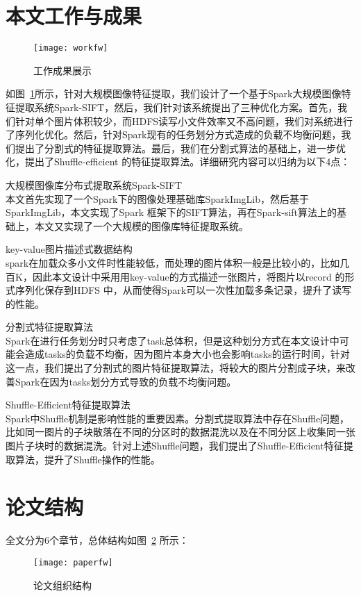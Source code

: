 \section{本文工作与成果}
\begin{figure}[htp]
\centering
\texttt{[image: workfw]}
\caption{工作成果展示}
\label{fig:workfw}
\end{figure}
如图~\ref{fig:workfw}所示，针对大规模图像特征提取，我们设计了一个基于Spark大规模图像特征提取系统Spark-SIFT，然后，我们针对该系统提出了三种优化方案。首先，我们针对单个图片体积较少，而HDFS读写小文件效率又不高问题，我们对系统进行了序列化优化。然后，针对Spark现有的任务划分方式造成的负载不均衡问题，我们提出了分割式的特征提取算法。最后，我们在分割式算法的基础上，进一步优化，提出了Shuffle-efficient 的特征提取算法。详细研究内容可以归纳为以下4点：
\begin{compactenum}
\item 大规模图像库分布式提取系统Spark-SIFT\\本文首先实现了一个Spark下的图像处理基础库SparkImgLib，然后基于SparkImgLib，本文实现了Spark 框架下的SIFT算法，再在Spark-sift算法上的基础上，本文又实现了一个大规模的图像库特征提取系统。
\item key-value图片描述式数据结构\\spark在加载众多小文件时性能较低，而处理的图片体积一般是比较小的，比如几百K，因此本文设计中采用用key-value的方式描述一张图片，将图片以record 的形式序列化保存到HDFS 中，从而使得Spark可以一次性加载多条记录，提升了读写的性能。
\item 分割式特征提取算法\\Spark在进行任务划分时只考虑了task总体积，但是这种划分方式在本文设计中可能会造成tasks的负载不均衡，因为图片本身大小也会影响tasks的运行时间，针对这一点，我们提出了分割式的图片特征提取算法，将较大的图片分割成子块，来改善Spark在因为tasks划分方式导致的负载不均衡问题。
\item Shuffle-Efficient特征提取算法\\Spark中Shuffle机制是影响性能的重要因素。分割式提取算法中存在Shuffle问题，比如同一图片的子块散落在不同的分区时的数据混洗以及在不同分区上收集同一张图片子块时的数据混洗。针对上述Shuffle问题，我们提出了Shuffle-Efficient特征提取算法，提升了Shuffle操作的性能。
\end{compactenum}

\section{论文结构}
全文分为6个章节，总体结构如图~\ref{fig:paperfw} 所示：
\begin{figure}[htp]
\centering
\texttt{[image: paperfw]}
\caption{论文组织结构}
\label{fig:paperfw}
\end{figure}

